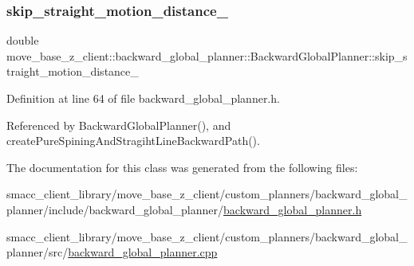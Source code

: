 \subsubsection{\texorpdfstring{skip\+\_\+straight\+\_\+motion\+\_\+distance\+\_\+}{skip\_straight\_motion\_distance\_}}
{\footnotesize\ttfamily double move\+\_\+base\+\_\+z\+\_\+client\+::backward\+\_\+global\+\_\+planner\+::\+Backward\+Global\+Planner\+::skip\+\_\+straight\+\_\+motion\+\_\+distance\+\_\+\hspace{0.3cm}{\ttfamily [private]}}



Definition at line 64 of file backward\+\_\+global\+\_\+planner.\+h.



Referenced by Backward\+Global\+Planner(), and create\+Pure\+Spining\+And\+Stragiht\+Line\+Backward\+Path().



The documentation for this class was generated from the following files\+:\begin{DoxyCompactItemize}
\item 
smacc\+\_\+client\+\_\+library/move\+\_\+base\+\_\+z\+\_\+client/custom\+\_\+planners/backward\+\_\+global\+\_\+planner/include/backward\+\_\+global\+\_\+planner/\hyperlink{backward__global__planner_8h}{backward\+\_\+global\+\_\+planner.\+h}\item 
smacc\+\_\+client\+\_\+library/move\+\_\+base\+\_\+z\+\_\+client/custom\+\_\+planners/backward\+\_\+global\+\_\+planner/src/\hyperlink{backward__global__planner_8cpp}{backward\+\_\+global\+\_\+planner.\+cpp}\end{DoxyCompactItemize}
